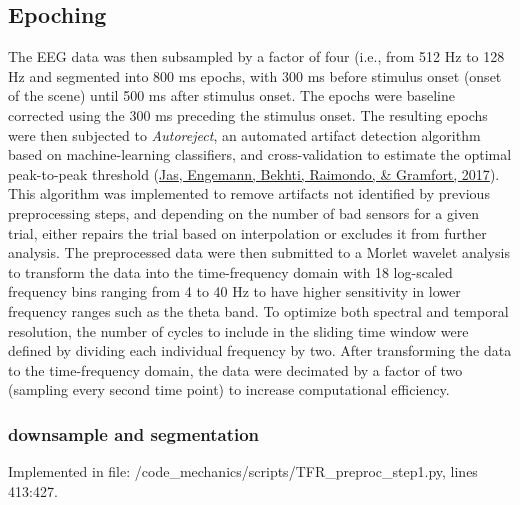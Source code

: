 \documentclass[
  man,floatsintext]{apa6}
\begin{document}
\hypertarget{epoching}{%
\subsection{Epoching}\label{epoching}}

The EEG data was then subsampled by a factor of four (i.e., from 512 Hz to 128 Hz and segmented into 800 ms epochs, with 300 ms before stimulus onset (onset of the scene) until 500 ms after stimulus onset. The epochs were baseline corrected using the 300 ms preceding the stimulus onset. The resulting epochs were then subjected to \emph{Autoreject}, an automated artifact detection algorithm based on machine-learning classifiers, and cross-validation to estimate the optimal peak-to-peak threshold (\protect\hyperlink{ref-jas2017}{Jas, Engemann, Bekhti, Raimondo, \& Gramfort, 2017}). This algorithm was implemented to remove artifacts not identified by previous preprocessing steps, and depending on the number of bad sensors for a given trial, either repairs the trial based on interpolation or excludes it from further analysis. The preprocessed data were then submitted to a Morlet wavelet analysis to transform the data into the time-frequency domain with 18 log-scaled frequency bins ranging from 4 to 40 Hz to have higher sensitivity in lower frequency ranges such as the theta band. To optimize both spectral and temporal resolution, the number of cycles to include in the sliding time window were defined by dividing each individual frequency by two. After transforming the data to the time-frequency domain, the data were decimated by a factor of two (sampling every second time point) to increase computational efficiency.

\hypertarget{downsample-and-segmentation}{%
\subsubsection{downsample and segmentation}\label{downsample-and-segmentation}}

Implemented in file: /code\_mechanics/scripts/TFR\_preproc\_step1.py, lines 413:427.
\end{document}
